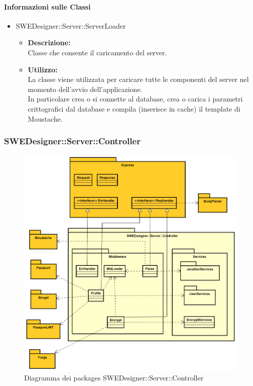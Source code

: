 		\paragraph{Informazioni sulle Classi}
		\begin{itemize}
			\item SWEDesigner::Server::ServerLoader
			\begin{itemize}
				\item \textbf{Descrizione: }\\
				Classe che consente il caricamento del server.
				\item \textbf{Utilizzo: }\\
				La classe viene utilizzata per caricare tutte le componenti del server nel momento dell'avvio dell'applicazione.\\
				In particolare crea o si connette al database, crea o carica i parametri crittografici dal database e compila (inserisce in cache) il template di Moustache.
			\end{itemize}
		\end{itemize}

		\subsubsection{SWEDesigner::Server::Controller}
		 \begin{figure}[h!]
		\centering
		\includegraphics[scale=0.4]{Disegnetti/SWEDesigner__Server__Controller.png}
		\caption{Diagramma dei packages SWEDesigner::Server::Controller}
 		\end{figure}
